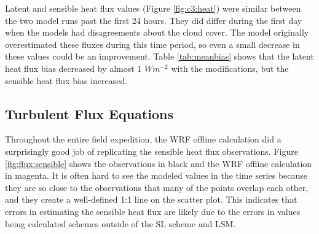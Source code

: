 Latent and sensible heat flux values (Figure \ref{fig:c3:heat}) were similar between the two model runs past the first 24 hours. They did differ during the first day when the models had disagreements about the cloud cover. The model originally overestimated these fluxes during this time period, so even a small decrease in these values could be an improvement. Table \ref{tab:meanbias} shows that the latent heat flux bias decreased by almost 1 $Wm^{-2}$ with the modifications, but the sensible heat flux bias increased. 

\subsection{Turbulent Flux Equations}
Throughout the entire field expedition, the WRF offline calculation did a surprisingly good job of replicating the sensible heat flux observations. Figure \ref{fig:flux:sensible} shows the observations in black and the WRF offline calculation in magenta. It is often hard to see the modeled values in the time series because they are so close to the observations that many of the points overlap each other, and they create a well-defined 1:1 line on the scatter plot. This indicates that errors in estimating the sensible heat flux are likely due to the errors in values being calculated schemes outside of the SL scheme and LSM. 

